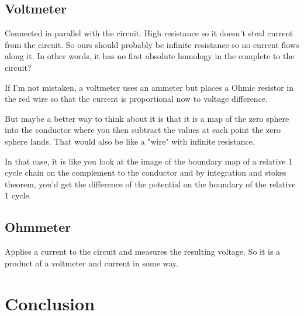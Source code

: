 \documentclass{article}
\begin{document}
\subsection{Voltmeter}

Connected in parallel with the circuit. High resistance so it doesn't steal current from the circuit. So ours should probably be infinite resistance so no current flows along it. In other words, it has no first absolute homology in the complete to the circuit?

If I'm not mistaken, a voltmeter uses an ammeter but places a Ohmic resistor in the red wire so that the current is proportional now to voltage difference. 

But maybe a better way to think about it is that it is a map of the zero sphere into the conductor where you then subtract the values at each point the zero sphere lands. That would also be like a "wire" with infinite resistance.

In that case, it is like you look at the image of the boundary map of a relative 1 cycle chain on the complement to the conductor and by integration and stokes theorem, you'd get the difference of the potential on the boundary of the relative 1 cycle.

\subsection{Ohmmeter}

Applies a current to the circuit and measures the resulting voltage. So it is a product of a voltmeter and current in some way.


\section{Conclusion}


%
\end{document}
